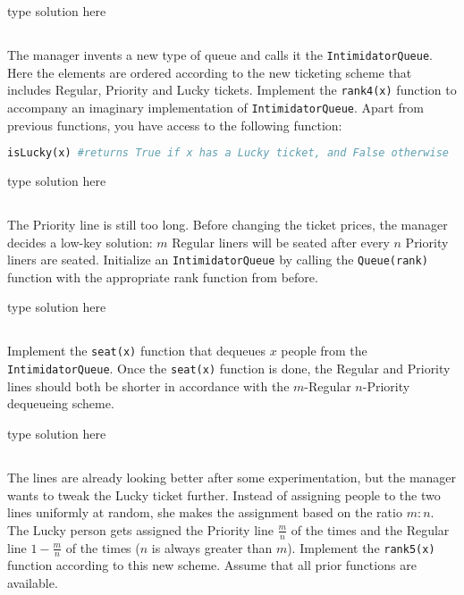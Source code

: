 \documentclass[addpoints]{exam}
\begin{document}
	\begin{mdframed}
		type solution here
	\end{mdframed}
	
	\subsection{}The manager invents a new type of queue and calls it the \texttt{IntimidatorQueue}. Here the elements are ordered according to the new ticketing scheme that includes Regular, Priority and Lucky tickets. Implement the \texttt{rank4(x)} function to accompany an imaginary implementation of \texttt{IntimidatorQueue}. Apart from previous functions, you have access to the following function:
	\begin{lstlisting}[language=Python]
	isLucky(x) #returns True if x has a Lucky ticket, and False otherwise\end{lstlisting}
	
	\begin{mdframed}
		type solution here
	\end{mdframed}
	
	\subsection{} The Priority line is still too long. Before changing the ticket prices, the manager decides a low-key solution: $m$ Regular liners will be seated after every $n$ Priority liners are seated. Initialize an \texttt{IntimidatorQueue} by calling the \texttt{Queue(rank)} function with the appropriate rank function from before. 
	
	\begin{mdframed}
		type solution here
	\end{mdframed}
	
	\subsection{} Implement the \texttt{seat(x)} function that dequeues $x$ people from the \texttt{IntimidatorQueue}. Once the \texttt{seat(x)} function is done, the Regular and Priority lines should both be shorter in accordance with the $m$-Regular $n$-Priority dequeueing scheme.
	
	\begin{mdframed}
		type solution here
	\end{mdframed}
	
	\subsection{} The lines are already looking better after some experimentation, but the manager wants to tweak the Lucky ticket further. Instead of assigning people to the two lines uniformly at random, she makes the assignment based on the ratio $m:n$. The Lucky person gets assigned the Priority line $\frac{m}{n}$ of the times and the Regular line $1 - \frac{m}{n}$ of the times ($n$ is always greater than $m$). Implement the \texttt{rank5(x)} function according to this new scheme. Assume that all prior functions are available.
	
\end{document}
